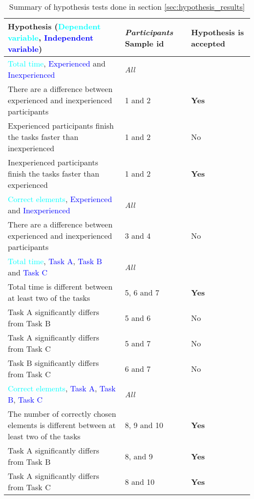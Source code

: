 	\begin{longtable}{p{}|p{}|p{}}  %
	\caption[Summary, hypothesis tests]{Summary of hypothesis tests done in section \ref{sec:hypothesis_results}} \label{tab:hypothesistest_summary} \\
		Hypothesis (\textcolor{cyan}{Dependent variable}, \textcolor{blue}{Independent variable}) & \textit{Participants} Sample id& Hypothesis is accepted \\[0.2cm] \hline
		\textcolor{cyan}{Total time}, \textcolor{blue}{Experienced} and \textcolor{blue}{Inexperienced} & \textit{All} &  \\
		There are a difference between experienced and inexperienced participants & 1 and 2 & \textbf{Yes} \\
		Experienced participants finish the tasks faster than inexperienced  & 1 and 2 & No   \\ 
		Inexperienced participants finish the tasks faster than experienced  & 1 and 2 & \textbf{Yes}   \\ \hline
		\textcolor{cyan}{Correct elements}, \textcolor{blue}{Experienced} and \textcolor{blue}{Inexperienced} & \textit{All} &  \\
		There are a difference between experienced and inexperienced participants & 3 and 4 & No   \\ \hline
		\textcolor{cyan}{Total time}, \textcolor{blue}{Task A}, \textcolor{blue}{Task B} and \textcolor{blue}{Task C}& \textit{All} &  \\
		 Total time is different between at least two of the tasks & 5, 6 and 7 & \textbf{Yes}   \\
		 Task A significantly differs from Task B & 5 and 6 & No  \\ 
		 Task A significantly differs from Task C & 5 and 7 & No  \\ 
		 Task B significantly differs from Task C & 6 and 7 & No  \\ \hline
		\textcolor{cyan}{Correct elements}, \textcolor{blue}{Task A}, \textcolor{blue}{Task B}, \textcolor{blue}{Task C} & \textit{All} &  \\
		The number of correctly chosen elements is different between at least two of the tasks & 8, 9 and 10 & \textbf{Yes}  \\
		Task A significantly differs from Task B & 8, and 9 & \textbf{Yes}  \\ 
		Task A significantly differs from Task C & 8 and 10 & \textbf{Yes}  \\ 

\end{longtable}
